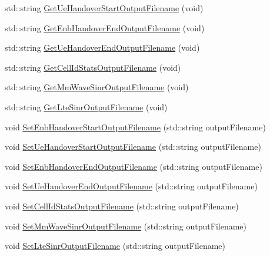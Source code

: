 \begin{DoxyCompactItemize}
\item 
std\+::string \hyperlink{classns3_1_1MmWaveBearerStatsConnector_af7866e3d0c30a9fbb7ff168df373a056}{Get\+Ue\+Handover\+Start\+Output\+Filename} (void)
\item 
std\+::string \hyperlink{classns3_1_1MmWaveBearerStatsConnector_ab570e8efa8515e659815bdcc91ca48af}{Get\+Enb\+Handover\+End\+Output\+Filename} (void)
\item 
std\+::string \hyperlink{classns3_1_1MmWaveBearerStatsConnector_a6924e5c1c1a1fd59cc93904c83afd88e}{Get\+Ue\+Handover\+End\+Output\+Filename} (void)
\item 
std\+::string \hyperlink{classns3_1_1MmWaveBearerStatsConnector_a47fee985b0824ae54b80e9b81d46d9a1}{Get\+Cell\+Id\+Stats\+Output\+Filename} (void)
\item 
std\+::string \hyperlink{classns3_1_1MmWaveBearerStatsConnector_ad93d036d016fecb9a808c72324152b79}{Get\+Mm\+Wave\+Sinr\+Output\+Filename} (void)
\item 
std\+::string \hyperlink{classns3_1_1MmWaveBearerStatsConnector_a6e8fef88d0041e2c3a7f1a6f8cdaaae8}{Get\+Lte\+Sinr\+Output\+Filename} (void)
\item 
void \hyperlink{classns3_1_1MmWaveBearerStatsConnector_a336d57c3b6b0466d1a820c899659bedd}{Set\+Enb\+Handover\+Start\+Output\+Filename} (std\+::string output\+Filename)
\item 
void \hyperlink{classns3_1_1MmWaveBearerStatsConnector_a0309b833489ffac2a7737121179ea646}{Set\+Ue\+Handover\+Start\+Output\+Filename} (std\+::string output\+Filename)
\item 
void \hyperlink{classns3_1_1MmWaveBearerStatsConnector_a28b6a2167e875d2069e1881f3890df55}{Set\+Enb\+Handover\+End\+Output\+Filename} (std\+::string output\+Filename)
\item 
void \hyperlink{classns3_1_1MmWaveBearerStatsConnector_a6becd4429d5bf23c9cce383f3c9a8e4a}{Set\+Ue\+Handover\+End\+Output\+Filename} (std\+::string output\+Filename)
\item 
void \hyperlink{classns3_1_1MmWaveBearerStatsConnector_a39ac0d8992c87f49009f0d71851f15ab}{Set\+Cell\+Id\+Stats\+Output\+Filename} (std\+::string output\+Filename)
\item 
void \hyperlink{classns3_1_1MmWaveBearerStatsConnector_aab1415a6360f9d8056a1910619c05c89}{Set\+Mm\+Wave\+Sinr\+Output\+Filename} (std\+::string output\+Filename)
\item 
void \hyperlink{classns3_1_1MmWaveBearerStatsConnector_adc4fe400b56fdb3822e62911315fcb0d}{Set\+Lte\+Sinr\+Output\+Filename} (std\+::string output\+Filename)
\end{DoxyCompactItemize}
